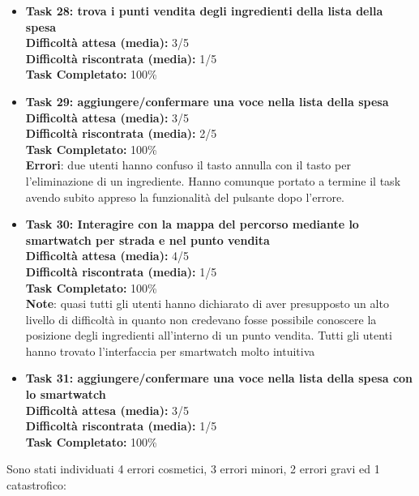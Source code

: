 \begin{itemize}
\item
\textbf{Task 28: trova i punti vendita degli ingredienti della lista
della spesa}\\
\textbf{Difficoltà attesa (media):} 3/5\\
\textbf{Difficoltà riscontrata (media):} 1/5\\
\textbf{Task Completato:} 100\%\\

\item
\textbf{Task 29: aggiungere/confermare una voce nella lista della spesa}
\textbf{Difficoltà attesa (media):} 3/5\\
\textbf{Difficoltà riscontrata (media):} 2/5\\
\textbf{Task Completato:} 100\%\\
\textbf{Errori}: due utenti hanno confuso il tasto annulla con il tasto per
l'eliminazione di un ingrediente. Hanno comunque portato a termine il task
avendo subito appreso la funzionalità del pulsante dopo l'errore.

\item
\textbf{Task 30: Interagire con la mappa del percorso mediante lo
smartwatch per strada e nel punto vendita}\\
\textbf{Difficoltà attesa (media):} 4/5\\
\textbf{Difficoltà riscontrata (media):} 1/5\\
\textbf{Task Completato:} 100\%\\
\textbf{Note}: quasi tutti gli utenti hanno dichiarato di aver presupposto un alto livello
di difficoltà in quanto non credevano fosse possibile conoscere la
posizione degli ingredienti all'interno di un punto vendita. Tutti gli
utenti hanno trovato l'interfaccia per smartwatch molto intuitiva

\item
\textbf{Task 31: aggiungere/confermare una voce nella lista della spesa con
lo smartwatch}\\
\textbf{Difficoltà attesa (media):} 3/5\\
\textbf{Difficoltà riscontrata (media):} 1/5\\
\textbf{Task Completato:} 100\%\\
\end{itemize}

Sono stati individuati 4 errori cosmetici, 3 errori minori, 2 errori
gravi ed 1 catastrofico:

